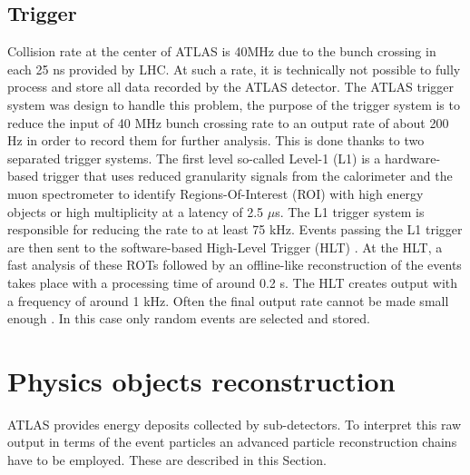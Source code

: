 \subsection{Trigger}
\label{chap2:ATLAS:Trigger}
Collision rate at the center of ATLAS is 40MHz due to the bunch crossing in each 25 ns provided by LHC. At such a rate, it is technically not possible to fully process and store all data recorded by the ATLAS detector. The ATLAS trigger system was design to handle this problem, the purpose of the trigger system is to reduce the input of 40 MHz bunch crossing rate to an output rate of about 200 Hz in order to record them for further analysis. This is done thanks to two separated trigger systems. The first level so-called Level-1 (L1) \cite{Trigger_L1} is a hardware-based trigger that uses reduced granularity signals from the calorimeter and the muon spectrometer to identify Regions-Of-Interest (ROI) with high energy objects or high multiplicity at a latency of 2.5 $\mu$s. The L1 trigger system is responsible for reducing the rate to at least 75 kHz. Events passing the L1 trigger are then sent to the software-based High-Level Trigger (HLT) \cite{Trigger_HLT}. At the HLT, a fast analysis of these ROTs followed by an offline-like reconstruction of the events takes place with a processing time of around 0.2 s. The HLT creates output with a frequency of around 1 kHz. Often the final output rate cannot be made small enough \cite{DQ}. In this case only random events are selected and stored.
\section{Physics objects reconstruction}
\label{chap2:Objects}
ATLAS provides energy deposits collected by sub-detectors. To interpret this raw output in terms of the event particles an advanced particle reconstruction chains have to be employed. These are described in this Section.

